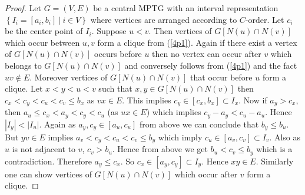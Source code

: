 \documentclass{article}
\theoremstyle{definition}
\numberwithin{equation}{section}
\newcommand{\set}[1]{\left\{#1\right\}}
\newcommand{\Set}[2]{\set{#1\ \vert\ #2}}
\begin{document}
\begin{proof}
Let $G=(V,E)$ be a central MPTG with an interval representation $\Set{I_{i}=[a_{i},b_{i}]}{i\in V}$ where vertices are arranged according to $C$-order. Let $c_{i}$ be the center point of $I_{i}$. Suppose $u<v$. Then vertices of $G[N(u)\cap N(v)]$ which occur between $u,v$ form a clique from (\ref{4p1}). Again if there exist a vertex of $G[N(u)\cap N(v)]$ occurs before $u$ then no vertex can occur after $v$ which belongs to $G[N(u)\cap N(v)]$ and conversely follows from (\ref{4p1}) and the fact $uv\notin E$. Moreover vertices of $G[N(u)\cap N(v)]$ that occur before $u$ form a clique. Let $x<y<u<v$ such that $x,y\in G[N(u)\cap N(v)]$ then $c_{x}<c_{y}<c_{u}<c_{v}\leq b_{x}$ as $vx\in E$. This implies $c_{y}\in[c_{x},b_{x}]\subset I_{x}$. Now if $a_{y}>c_{x}$, then $a_{u}\leq c_{x}<a_{y}<c_{y}<c_{u}$ (as $ux\in E$) which implies $c_{y}-a_{y}<c_{u}-a_{u}$. Hence $|I_{y}|<|I_{u}|$. Again as $a_{y},c_{y}\in[a_{u},c_{u}]$ from above we can conclude that $b_{y}\leq b_{u}$. But $yv\in E$ implies $a_{v}<c_{y}<c_{u}<c_{v}\leq b_{y}$ which imply $c_{u}\in[a_{v},c_{v}]\subset I_{v}$. Also as $u$ is not adjacent to $v$, $c_{v}>b_{u}$. Hence from above we get $b_{u}<c_{v}\leq b_{y}$ which is a contradiction. Therefore $a_{y}\leq c_{x}$. So $c_{x}\in [a_{y},c_{y}]\subset I_{y}$. Hence $xy\in E$. Similarly one can show vertices of $G[N(u)\cap N(v)]$ which occur after $v$ form a clique.


\end{proof}
\end{document}
